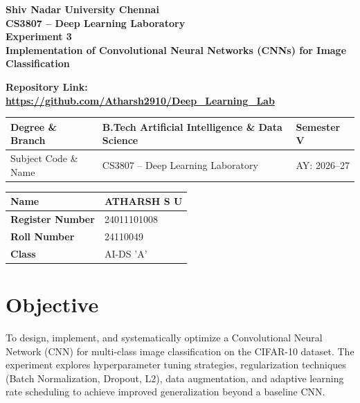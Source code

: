 \documentclass[11pt]{article}
\begin{document}
\begin{center}
{\Large\textbf{Shiv Nadar University Chennai}}\\
\textbf{CS3807 -- Deep Learning Laboratory}\\
\textbf{Experiment 3}\\
{\large\textbf{Implementation of Convolutional Neural Networks (CNNs) for Image Classification
}}

\textbf{Repository Link:}
\textbf{\url{https://github.com/Atharsh2910/Deep_Learning_Lab}
}

\end{center}

\renewcommand{\arraystretch}{1.25}

\begin{tabular}{|p{3.8cm}|p{8cm}|p{2cm}|}
\hline
Degree \& Branch & B.Tech Artificial Intelligence \& Data Science & Semester V\\ \hline
Subject Code \& Name & CS3807 -- Deep Learning Laboratory & AY: 2026--27\\ \hline
\end{tabular}

\begin{tabular}{|p{3.5cm}|p{8cm}|}
\hline
\textbf{Name} & {ATHARSH S U}\\ \hline
\textbf{Register Number} &{24011101008} \\ \hline
\textbf{Roll Number} &{24110049} \\ \hline
\textbf{Class} & {AI-DS 'A'}\\ \hline
\end{tabular}
\vspace{3mm}

\section{Objective}
To design, implement, and systematically optimize a Convolutional Neural Network (CNN) for multi-class image classification on the CIFAR-10 dataset. The experiment explores hyperparameter tuning strategies, regularization techniques (Batch Normalization, Dropout, L2), data augmentation, and adaptive learning rate scheduling to achieve improved generalization beyond a baseline CNN.

\end{document}
